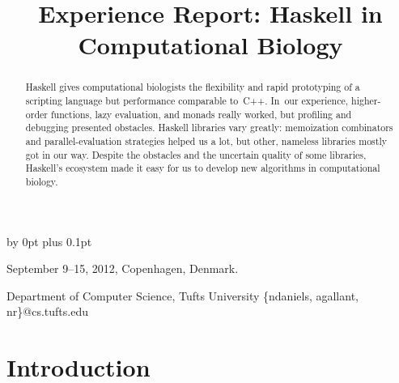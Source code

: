 \documentclass[nonatbib,preprint,blockstyle,times]{sigplanconf}
\begin{document}
\parskip %
\advance \parskip by 0pt plus 0.1pt

\overfullrule=10pt


 {September 9--15, 2012, Copenhagen, Denmark.}


\title{Experience Report: Haskell in Computational Biology}


           {Department of Computer Science, Tufts University}
           {{\rmfamily\{}ndaniels, agallant, nr{\rmfamily\}}@cs.tufts.edu}


\maketitle

%
%
%
\begin{abstract}
Haskell gives computational biologists
the flexibility and rapid prototyping of a scripting
language but performance comparable to~C++.
In~our experience, higher-order functions, lazy evaluation, and
monads really worked, but
profiling and debugging presented obstacles.
Haskell libraries vary greatly:
memoization combinators and parallel-evaluation
strategies helped us a lot,
but other, nameless libraries mostly got in our way.
Despite the obstacles and the uncertain quality of some libraries,
Haskell's ecosystem
made it easy for us to develop new algorithms in computational
biology.
\end{abstract}

% 
% 

\section{Introduction}
\end{document}
